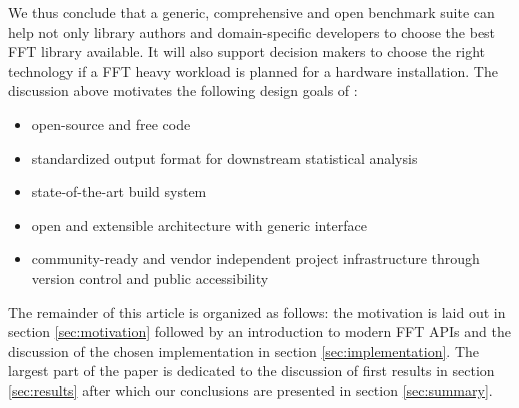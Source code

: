 We thus conclude that a generic, comprehensive and open benchmark suite can help not only library authors and domain-specific developers to choose the best FFT library available. It will also support decision makers to choose the right technology if a FFT heavy workload is planned for a hardware installation. The discussion above motivates the following design goals of \gearshifft{}:

\begin{itemize}
\item open-source and free code
\item standardized output format for downstream statistical analysis
\item state-of-the-art build system
\item open and extensible architecture with generic interface
\item community-ready and vendor independent project infrastructure through version control and public accessibility
\end{itemize}

The remainder of this article is organized as follows: the motivation is laid out in section \ref{sec:motivation} followed by an introduction to modern FFT APIs and the discussion of the chosen implementation in section \ref{sec:implementation}. The largest part of the paper is dedicated to the discussion of first results in section \ref{sec:results} after which our conclusions are presented in section \ref{sec:summary}.

